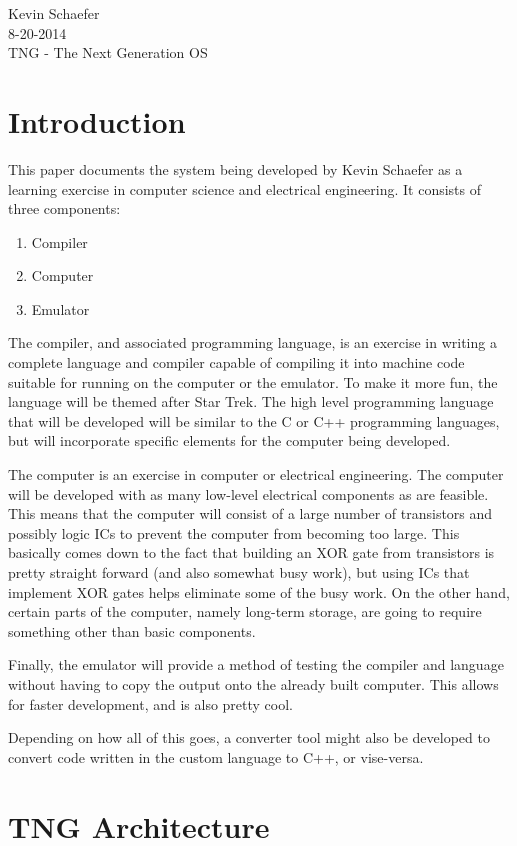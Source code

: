 \documentclass{book}
\begin{document}
\noindent Kevin Schaefer \\
8-20-2014 \\
TNG - The Next Generation OS \\

\chapter{Introduction}
This paper documents the system being developed by Kevin Schaefer as a learning
exercise in computer science and electrical engineering. It consists of three
components:
\begin{enumerate}
  \item Compiler
  \item Computer
  \item Emulator
\end{enumerate}

The compiler, and associated programming language, is an exercise in writing
a complete language and compiler capable of compiling it into machine code suitable
for running on the computer or the emulator. To make it more fun, the language will
be themed after Star Trek. The high level programming language that will be developed
will be similar to the C or C++ programming languages, but will incorporate specific
elements for the computer being developed.

The computer is an exercise in computer or electrical engineering. The computer will
be developed with as many low-level electrical components as are feasible. This means
that the computer will consist of a large number of transistors and possibly logic ICs
to prevent the computer from becoming too large. This basically comes down to the fact
that building an XOR gate from transistors is pretty straight forward (and also somewhat
busy work), but using ICs that implement XOR gates helps eliminate some of the busy work.
On the other hand, certain parts of the computer, namely long-term storage, are going to
require something other than basic components.

Finally, the emulator will provide a method of testing the compiler and language without having
to copy the output onto the already built computer. This allows for faster development, and
is also pretty cool.

Depending on how all of this goes, a converter tool might also be developed to convert code
written in the custom language to C++, or vise-versa.


\chapter{TNG Architecture}
\end{document}
